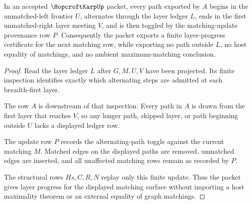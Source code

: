 \begin{theorem}
\label{thm:hopcroft-karp-augmenting-layer-progress}
In an accepted $\HopcroftKarpUp$ packet, every path exported by $A$ begins in the unmatched-left frontier $U$, alternates through the layer ledger $L$, ends in the first unmatched-right layer meeting $V$, and is then toggled by the matching-update provenance row $P$. Consequently the packet exports a finite layer-progress certificate for the next matching row, while exporting no path outside $L$, no host equality of matchings, and no ambient maximum-matching conclusion.
\end{theorem}
\begin{proof}
Read the layer ledger $L$ after $G,M,U,V$ have been projected. Its finite inspection identifies exactly which alternating steps are admitted at each breadth-first layer.

The row $A$ is downstream of that inspection. Every path in $A$ is drawn from the first layer that reaches $V$, so any longer path, skipped layer, or path beginning outside $U$ lacks a displayed ledger row.

The update row $P$ records the alternating-path toggle against the current matching $M$. Matched edges on the displayed paths are removed, unmatched edges are inserted, and all unaffected matching rows remain as recorded by $P$.

The structural rows $Hs,C,R,N$ replay only this finite update. Thus the packet gives layer progress for the displayed matching surface without importing a host maximality theorem or an external equality of graph matchings.
\end{proof}




